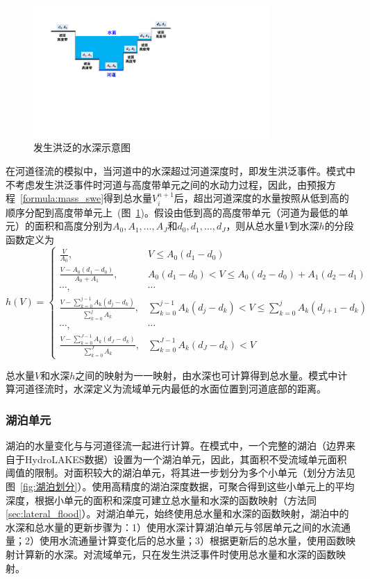 {
  \begin{figure}[htbp]
    \centering
    \includegraphics[width=0.8\textwidth]{Figures/侧向流/发生洪泛时的水深.pdf}
    \caption{发生洪泛的水深示意图}
    \label{fig:lateral_flood}
  \end{figure}
}
在河道径流的模拟中，当河道中的水深超过河道深度时，即发生洪泛事件。模式中不考虑发生洪泛事件时河道与高度带单元之间的水动力过程，因此，由预报方程~\eqref{formula:mass_swe}得到总水量$V^{n+1}_i$后，超出河道深度的水量按照从低到高的顺序分配到高度带单元上~(图~\ref{fig:lateral_flood})。假设由低到高的高度带单元（河道为最低的单元）的面积和高度分别为$A_{0},A_{1},\ldots,A_{J}$和$d_{0},d_{1},\ldots,d_{J}$，则从总水量$V$到水深$h$的分段函数定义为
\begin{equation}
  h(V) = \begin{cases}
    \frac{V}{A_0}, & V \leqslant A_{0} \left(d_1 - d_0\right)\\
    \frac{V-A_{0} \left(d_1 - d_0\right)}{A_0+A_1}, & A_{0} \left(d_1 - d_0\right) < V \leqslant A_{0} \left(d_2 - d_0\right) + A_{1} \left(d_2 - d_1\right) \\
    \cdots, & \cdots \\
    \frac{V-\sum^{j-1}_{k=0}A_{\mathrm {k}} (d_{j}-d_k)}{\sum^j_{k=0}A_k}, & \sum^{j-1}_{k=0}A_k(d_{j}-d_k) < V \leqslant \sum^{j}_{k=0}A_k(d_{j+1}-d_k)\\
    \cdots, & \cdots  \\
    \frac{V-\sum^{J-1}_{k=0}A_k(d_{J}-d_k)}{\sum^J_{k=0}A_k}, & \sum^{J-1}_{k=0}A_k(d_{J}-d_k) < V
  \end{cases}
\end{equation}

总水量$V$和水深$h$之间的映射为一一映射，由水深也可计算得到总水量。模式中计算河道径流时，水深定义为流域单元内最低的水面位置到河道底部的距离。

\subsubsection{湖泊单元}
湖泊的水量变化与与河道径流一起进行计算。在模式中，一个完整的湖泊（边界来自于HydroLAKES数据）设置为一个湖泊单元，因此，其面积不受流域单元面积阈值的限制。对面积较大的湖泊单元，将其进一步划分为多个小单元（划分方法见图~\ref{fig:湖泊划分}）。使用高精度的湖泊深度数据，可聚合得到这些小单元上的平均深度，根据小单元的面积和深度可建立总水量和水深的函数映射（方法同\ref{sec:lateral_flood}）。对湖泊单元，始终使用总水量和水深的函数映射，湖泊中的水深和总水量的更新步骤为：1）使用水深计算湖泊单元与邻居单元之间的水流通量；2）使用水流通量计算变化后的总水量；3）根据更新后的总水量，使用函数映射计算新的水深。对流域单元，只在发生洪泛事件时使用总水量和水深的函数映射。

